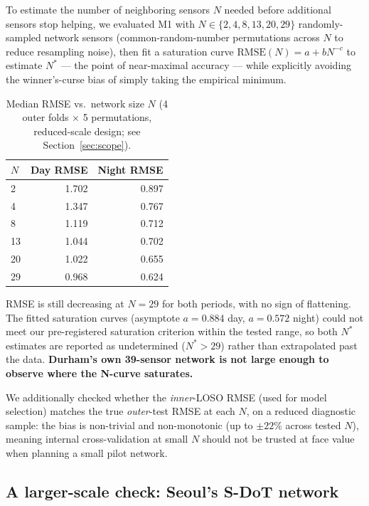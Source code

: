 \documentclass[11pt]{article}
\begin{document}
To estimate the number of neighboring sensors $N$ needed before additional
sensors stop helping, we evaluated M1 with $N \in \{2,4,8,13,20,29\}$
randomly-sampled network sensors (common-random-number permutations across
$N$ to reduce resampling noise), then fit a saturation curve
$\text{RMSE}(N) = a + bN^{-c}$ to estimate $N^*$ --- the point of
near-maximal accuracy --- while explicitly avoiding the winner's-curse bias
of simply taking the empirical minimum.

\begin{table}[H]
  \centering
  \caption{Median RMSE vs.\ network size $N$ (4 outer folds $\times$ 5
  permutations, reduced-scale design; see Section~\ref{sec:scope}).}
  \label{tab:ncurve}
  \begin{tabular}{lrr}
    \toprule
    $N$ & Day RMSE & Night RMSE \\
    \midrule
    2  & 1.702 & 0.897 \\
    4  & 1.347 & 0.767 \\
    8  & 1.119 & 0.712 \\
    13 & 1.044 & 0.702 \\
    20 & 1.022 & 0.655 \\
    29 & 0.968 & 0.624 \\
    \bottomrule
  \end{tabular}
\end{table}

RMSE is still decreasing at $N=29$ for both periods, with no sign of
flattening. The fitted saturation curves (asymptote $a = 0.884$ day,
$a = 0.572$ night) could not meet our pre-registered saturation criterion
within the tested range, so both $N^*$ estimates are reported as
undetermined ($N^* > 29$) rather than extrapolated past the data.
\textbf{Durham's own 39-sensor network is not large enough to observe where
the N-curve saturates.}

We additionally checked whether the \emph{inner}-LOSO RMSE (used for model
selection) matches the true \emph{outer}-test RMSE at each $N$, on a
reduced diagnostic sample: the bias is non-trivial and non-monotonic (up to
$\pm22\%$ across tested $N$), meaning internal cross-validation at small
$N$ should not be trusted at face value when planning a small pilot
network.

\subsection*{A larger-scale check: Seoul's S-DoT network}
\end{document}
